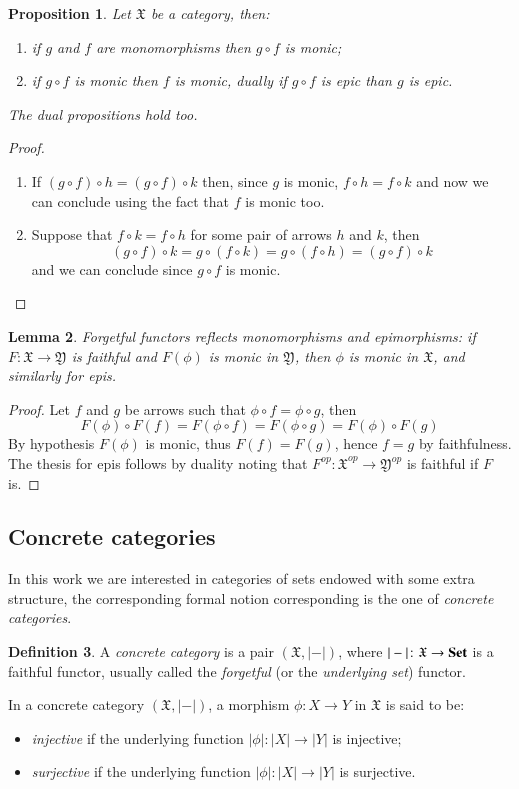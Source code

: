 \documentclass[12pt]{article}
\newtheorem{lemma}{Lemma}[section]
\newtheorem{proposition}[lemma]{Proposition}
\theoremstyle{definition}
\newtheorem{definition}[lemma]{Definition}
\def\X{\mathfrak X}
\def\Y{\mathfrak Y}
\newcommand{\Set}{\textbf{\textup{Set}}}
\numberwithin{equation}{section}
\begin{document}
\begin{proposition}\label{composition}Let $\X$ be a category, then:
	\begin{enumerate}[\rm (1)]
		\item if $g$ and $f$ are monomorphisms then $g\circ f$ is monic;
		\item if $g\circ f$ is monic then $f$ is monic, dually if $g\circ f$ is epic than $g$ is epic. 
	\end{enumerate}
The dual propositions hold too.
	\end{proposition}
\begin{proof}
	\begin{enumerate} [\rm (1)]
		\item If $(g\circ f)\circ h=(g\circ f)\circ k$ then, since $g$ is monic, $f\circ h=f\circ k$ and now we can conclude using the fact that $f$ is monic too.
		\item Suppose that $f\circ k=f\circ h$ for some pair of arrows $h$ and $k$, then 
		\[(g\circ f)\circ k= g\circ (f\circ k)=g\circ (f\circ h)=(g\circ f)\circ k\]
		and we can conclude since $g\circ f$ is monic. \qedhere 
	\end{enumerate}
\end{proof}


\begin{lemma}\label{faithful}Forgetful functors reflects monomorphisms and epimorphisms: if  $F\colon \X \to \Y$ is faithful and  $F(\phi)$ is monic in $\Y$, then $\phi$ is monic in $\X$, and similarly for epis.
\end{lemma}
\begin{proof}
Let $f$ and $g$ be arrows such that $\phi\circ f=\phi\circ g$, then
\[
F(\phi)\circ F(f)=F(\phi \circ f)=F(\phi \circ g)=F(\phi)\circ F(g)
\]
By hypothesis $F(\phi)$ is monic, thus $F(f)=F(g)$, hence $f=g$ by faithfulness.
The thesis for epis follows by duality noting that $F^{op}:\X^{op}\rightarrow \Y^{op}$ is faithful if $F$ is.
\end{proof}


\subsection{Concrete categories}
In this work we are interested in categories of sets endowed with some extra structure, the corresponding formal notion corresponding is the one of \emph{concrete categories}.
\begin{definition}
	A {\em concrete category} is a pair $(\X,|-|)$, where $|-|\colon \X\to \Set$ is a faithful functor, usually called the \emph{forgetful} (or the \emph{underlying set}) functor. 
	
	In a concrete category $(\X,|-|)$, a morphism $\phi\colon X\to Y$ in $\X$ is said to be:
	\begin{itemize}
		\item {\em injective} if the underlying function $|\phi|\colon |X|\to |Y|$ is injective;
		\item {\em surjective} if the underlying function $|\phi|\colon |X|\to |Y|$ is surjective.
	\end{itemize}
\end{definition}
\end{document}
